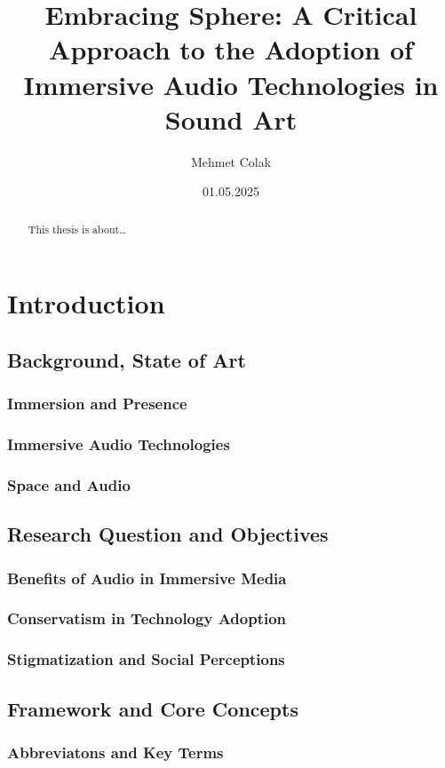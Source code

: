 \documentclass[a4paper, 12pt]{report}
\author{Mehmet Colak}
\title{Embracing Sphere: A Critical Approach to the Adoption
of Immersive Audio Technologies in Sound Art}
\date{01.05.2025}
\begin{document}
\maketitle
\tableofcontents

\begin{abstract}
    This thesis is about\ldots
\end{abstract}

\newpage


\chapter{Introduction}
    \section{Background, State of Art}
        \subsection{Immersion and Presence}
        \subsection{Immersive Audio Technologies}
        \subsection{Space and Audio}
    \section{Research Question and Objectives}
        \subsection{Benefits of Audio in Immersive Media}
        \subsection{Conservatism in Technology Adoption}
        \subsection{Stigmatization and Social Perceptions}
    \section{Framework and Core Concepts}
        \subsection{Abbreviatons and Key Terms}
\end{document}
